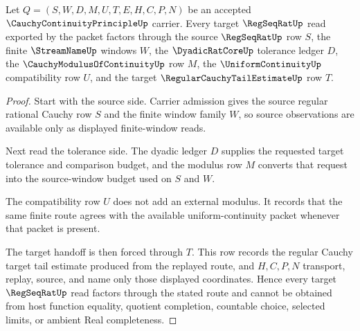 \begin{theorem}
\label{thm:cauchy-continuity-principle-regseqrat-handoff}
Let $Q=(S,W,D,M,U,T,E,H,C,P,N)$ be an accepted $\CauchyContinuityPrincipleUp$ carrier. Every target $\RegSeqRatUp$ read exported by the packet factors through the source $\RegSeqRatUp$ row $S$, the finite $\StreamNameUp$ windows $W$, the $\DyadicRatCoreUp$ tolerance ledger $D$, the $\CauchyModulusOfContinuityUp$ row $M$, the $\UniformContinuityUp$ compatibility row $U$, and the target $\RegularCauchyTailEstimateUp$ row $T$.
\end{theorem}
\begin{proof}
Start with the source side. Carrier admission gives the source regular rational Cauchy row $S$ and the finite window family $W$, so source observations are available only as displayed finite-window reads.

Next read the tolerance side. The dyadic ledger $D$ supplies the requested target tolerance and comparison budget, and the modulus row $M$ converts that request into the source-window budget used on $S$ and $W$.

The compatibility row $U$ does not add an external modulus. It records that the same finite route agrees with the available uniform-continuity packet whenever that packet is present.

The target handoff is then forced through $T$. This row records the regular Cauchy target tail estimate produced from the replayed route, and $H,C,P,N$ transport, replay, source, and name only those displayed coordinates. Hence every target $\RegSeqRatUp$ read factors through the stated route and cannot be obtained from host function equality, quotient completion, countable choice, selected limits, or ambient Real completeness.
\end{proof}

